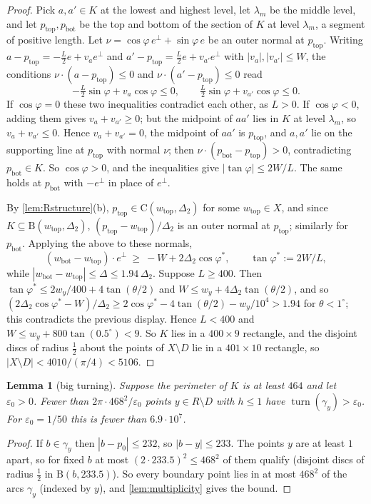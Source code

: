\documentclass[11pt]{amsart}
\newtheorem{lemma}[theorem]{Lemma}
\theoremstyle{definition}
\theoremstyle{remark}
\newcommand{\Dt}{\Delta_2}
\newcommand{\eps}{\varepsilon}
\newcommand{\turn}{\operatorname{turn}}
\newcommand{\Cc}{\mathrm{C}}      %
\newcommand{\Dd}{\mathrm{B}}      %
\begin{document}
\begin{proof}
Pick $a,a'\in K$ at the lowest and highest level, let $\lambda_m$ be the middle level, and let $p_{\mathrm{top}},p_{\mathrm{bot}}$ be the top and bottom of the section of $K$ at level $\lambda_m$, a segment of positive length. Let $\nu=\cos\varphi\,e^\perp+\sin\varphi\,e$ be an outer normal at $p_{\mathrm{top}}$. Writing $a-p_{\mathrm{top}}=-\frac L2e+v_ae^\perp$ and $a'-p_{\mathrm{top}}=\frac L2e+v_{a'}e^\perp$ with $|v_a|,|v_{a'}|\le W$, the conditions $\nu\cdot(a-p_{\mathrm{top}})\le0$ and $\nu\cdot(a'-p_{\mathrm{top}})\le0$ read
\[
-\tfrac L2\sin\varphi+v_a\cos\varphi\le0,\qquad \tfrac L2\sin\varphi+v_{a'}\cos\varphi\le0 .
\]
If $\cos\varphi=0$ these two inequalities contradict each other, as $L>0$. If $\cos\varphi<0$, adding them gives $v_a+v_{a'}\ge0$; but the midpoint of $aa'$ lies in $K$ at level $\lambda_m$, so $v_a+v_{a'}\le0$. Hence $v_a+v_{a'}=0$, the midpoint of $aa'$ is $p_{\mathrm{top}}$, and $a,a'$ lie on the supporting line at $p_{\mathrm{top}}$ with normal $\nu$; then $\nu\cdot(p_{\mathrm{bot}}-p_{\mathrm{top}})>0$, contradicting $p_{\mathrm{bot}}\in K$. So $\cos\varphi>0$, and the inequalities give $|\tan\varphi|\le2W/L$. The same holds at $p_{\mathrm{bot}}$ with $-e^\perp$ in place of $e^\perp$.

By \cref{lem:Rstructure}(b), $p_{\mathrm{top}}\in\Cc(w_{\mathrm{top}},\Dt)$ for some $w_{\mathrm{top}}\in X$, and since $K\subseteq\Dd(w_{\mathrm{top}},\Dt)$, $(p_{\mathrm{top}}-w_{\mathrm{top}})/\Dt$ is an outer normal at $p_{\mathrm{top}}$; similarly for $p_{\mathrm{bot}}$. Applying the above to these normals,
\[
(w_{\mathrm{bot}}-w_{\mathrm{top}})\cdot e^\perp\ \ge\ -W+2\Dt\cos\varphi^*,\qquad\tan\varphi^*:=2W/L,
\]
while $|w_{\mathrm{bot}}-w_{\mathrm{top}}|\le\Delta\le1.94\,\Dt$. Suppose $L\ge400$. Then $\tan\varphi^*\le2w_y/400+4\tan(\theta/2)$ and $W\le w_y+4\Dt\tan(\theta/2)$, and so $(2\Dt\cos\varphi^*-W)/\Dt\ge2\cos\varphi^*-4\tan(\theta/2)-w_y/10^4>1.94$ for $\theta<1^\circ$; this contradicts the previous display. Hence $L<400$ and $W\le w_y+800\tan(0.5^\circ)<9$. So $K$ lies in a $400\times9$ rectangle, and the disjoint discs of radius $\frac12$ about the points of $X\setminus D$ lie in a $401\times10$ rectangle, so $|X\setminus D|<4010/(\pi/4)<5106$.
\end{proof}

\begin{lemma}[big turning]\label{lem:bigturn}
Suppose the perimeter of $K$ is at least $464$ and let $\eps_0>0$. Fewer than $2\pi\cdot468^2/\eps_0$ points $y\in R\setminus D$ with $h\le1$ have $\turn(\gamma_y)>\eps_0$. For $\eps_0=1/50$ this is fewer than $6.9\cdot10^7$.
\end{lemma}
\begin{proof}
If $b\in\gamma_y$ then $|b-p_0|\le232$, so $|b-y|\le233$. The points $y$ are at least $1$ apart, so for fixed $b$ at most $(2\cdot233.5)^2\le468^2$ of them qualify (disjoint discs of radius $\frac12$ in $\Dd(b,233.5)$). So every boundary point lies in at most $468^2$ of the arcs $\gamma_y$ (indexed by $y$), and \cref{lem:multiplicity} gives the bound.
\end{proof}
\end{document}
